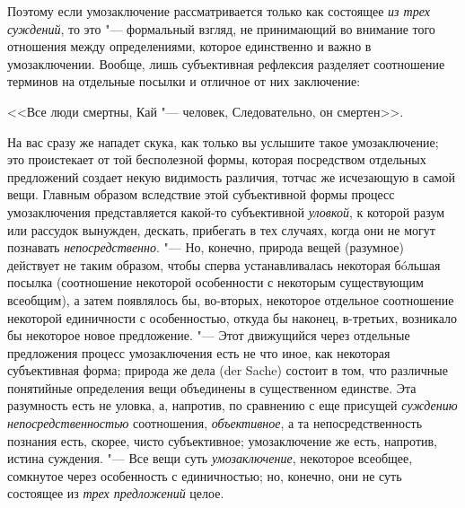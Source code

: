 Поэтому если умозаключение рассматривается только как
состоящее {\em из трех суждений},
то это "--- формальный взгляд, не принимающий во
внимание того отношения между определениями, которое единственно и важно в
умозаключении. Вообще, лишь субъективная рефлексия разделяет соотношение
терминов на отдельные посылки и отличное от них заключение:

<<Все люди смертны,
Кай "--- человек,
Следовательно, он смертен>>.

На вас сразу же нападет скука, как только вы услышите такое
умозаключение; это проистекает от той бесполезной формы, которая
посредством отдельных предложений создает некую видимость различия, тотчас
же исчезающую в самой вещи. Главным образом вследствие этой субъективной
формы процесс умозаключения представляется какой-то субъективной
{\em уловкой}, к которой
разум или рассудок вынужден, дескать, прибегать в тех случаях, когда они не
могут познавать {\em непосредственно}.
"--- Но, конечно, природа вещей (разумное) действует не таким
образом, чтобы сперва устанавливалась некоторая бóльшая посылка
(соотношение некоторой особенности с некоторым существующим всеобщим), а
затем появлялось бы, во-вторых, некоторое отдельное соотношение некоторой
единичности с особенностью, откуда бы наконец, в-третьих, возникало бы
некоторое новое предложение. "--- \label{bkm:bm52a}Этот
движущийся через отдельные предложения процесс умозаключения есть не что
иное, как некоторая субъективная форма; природа же дела (der Sache) состоит
в том, что различные понятийные определения вещи объединены в существенном
единстве. Эта разумность есть не уловка, а, напротив, по сравнению с еще
присущей {\em суждению
непосредственностью} соотношения,
{\em объективное}, а та
непосредственность познания есть, скорее, чисто субъективное; умозаключение
же есть, напротив, истина суждения. "--- Все вещи суть
{\em умозаключение},
некоторое всеобщее, сомкнутое через особенность с
единичностью; но, конечно, они не суть состоящее из
{\em трех предложений}
целое.

